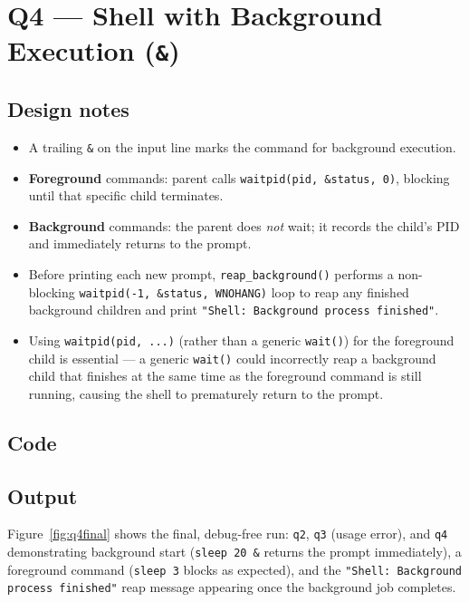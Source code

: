\newpage
\section{Q4 --- Shell with Background Execution (\texttt{\&})}

\subsection*{Design notes}
\begin{itemize}
    \item A trailing \texttt{\&} on the input line marks the command for background execution.
    \item \textbf{Foreground} commands: parent calls \texttt{waitpid(pid, \&status, 0)},
          blocking until that specific child terminates.
    \item \textbf{Background} commands: the parent does \emph{not} wait; it records the
          child's PID and immediately returns to the prompt.
    \item Before printing each new prompt, \texttt{reap\_background()} performs a
          non-blocking \texttt{waitpid(-1, \&status, WNOHANG)} loop to reap any finished
          background children and print \texttt{"Shell: Background process finished"}.
    \item Using \texttt{waitpid(pid, ...)} (rather than a generic \texttt{wait()}) for the
          foreground child is essential --- a generic \texttt{wait()} could incorrectly
          reap a background child that finishes at the same time as the foreground
          command is still running, causing the shell to prematurely return to the prompt.
\end{itemize}

\subsection*{Code}


\subsection*{Output}
Figure~\ref{fig:q4final} shows the final, debug-free run: \texttt{q2}, \texttt{q3}
(usage error), and \texttt{q4} demonstrating background start
(\texttt{sleep 20 \&} returns the prompt immediately), a foreground command
(\texttt{sleep 3} blocks as expected), and the \texttt{"Shell: Background process finished"}
reap message appearing once the background job completes.

